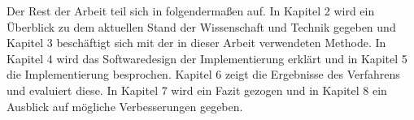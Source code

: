 Der Rest der Arbeit teil sich in folgendermaßen auf. In Kapitel 2 wird ein Überblick zu dem aktuellen Stand der Wissenschaft und Technik gegeben und Kapitel 3 beschäftigt sich mit der in dieser Arbeit verwendeten Methode. In Kapitel 4 wird das Softwaredesign der Implementierung erklärt und in Kapitel 5 die Implementierung besprochen. Kapitel 6 zeigt die Ergebnisse des Verfahrens und evaluiert diese. In Kapitel 7 wird ein Fazit gezogen und in Kapitel 8 ein Ausblick auf mögliche Verbesserungen gegeben.